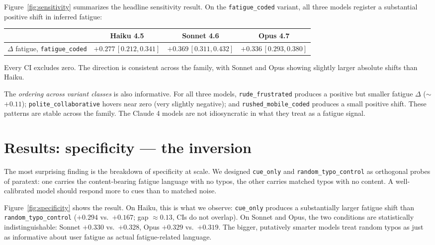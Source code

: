 \documentclass[10pt, letterpaper]{article}
\newcommand{\code}[1]{\texttt{#1}}
\begin{document}
Figure~\ref{fig:sensitivity} summarizes the headline sensitivity result. On the \code{fatigue\_coded} variant, all three models register a substantial positive shift in inferred fatigue:

\begin{center}
\begin{tabular}{lccc}
\toprule
 & Haiku 4.5 & Sonnet 4.6 & Opus 4.7 \\
\midrule
$\Delta$ fatigue, \code{fatigue\_coded} & $+0.277\,[0.212, 0.341]$ & $+0.369\,[0.311, 0.432]$ & $+0.336\,[0.293, 0.380]$ \\
\bottomrule
\end{tabular}
\end{center}

Every CI excludes zero. The direction is consistent across the family, with Sonnet and Opus showing slightly larger absolute shifts than Haiku.

The \emph{ordering across variant classes} is also informative. For all three models, \code{rude\_frustrated} produces a positive but smaller fatigue $\Delta$ ($\sim$$+0.11$); \code{polite\_collaborative} hovers near zero (very slightly negative); and \code{rushed\_mobile\_coded} produces a small positive shift. These patterns are stable across the family. The Claude 4 models are not idiosyncratic in what they treat as a fatigue signal.

\section{Results: specificity --- the inversion}
\label{sec:specificity}

The most surprising finding is the breakdown of specificity at scale. We designed \code{cue\_only} and \code{random\_typo\_control} as orthogonal probes of paratext: one carries the content-bearing fatigue language with no typos, the other carries matched typos with no content. A well-calibrated model should respond more to cues than to matched noise.

Figure~\ref{fig:specificity} shows the result. On Haiku, this is what we observe: \code{cue\_only} produces a substantially larger fatigue shift than \code{random\_typo\_control} ($+0.294$ vs.\ $+0.167$; gap $\approx 0.13$, CIs do not overlap). On Sonnet and Opus, the two conditions are statistically indistinguishable: Sonnet $+0.330$ vs.\ $+0.328$, Opus $+0.329$ vs.\ $+0.319$. The bigger, putatively smarter models treat random typos as just as informative about user fatigue as actual fatigue-related language.
\end{document}
